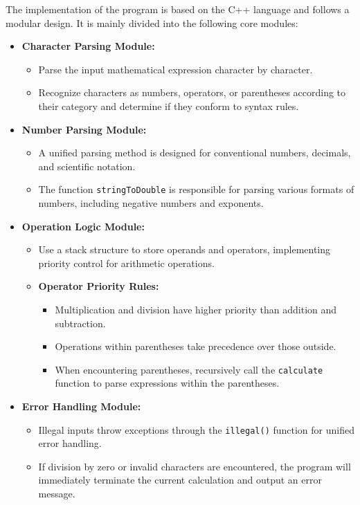 \documentclass{article}
\begin{document}
The implementation of the program is based on the C++ language and follows a modular design. It is mainly divided into the following core modules:

\begin{itemize}
    \item \textbf{Character Parsing Module:}
    \begin{itemize}
        \item Parse the input mathematical expression character by character.
        \item Recognize characters as numbers, operators, or parentheses according to their category and determine if they conform to syntax rules.
    \end{itemize}
    \item \textbf{Number Parsing Module:}
    \begin{itemize}
        \item A unified parsing method is designed for conventional numbers, decimals, and scientific notation.
        \item The function \texttt{stringToDouble} is responsible for parsing various formats of numbers, including negative numbers and exponents.
    \end{itemize}
    \item \textbf{Operation Logic Module:}
    \begin{itemize}
        \item Use a stack structure to store operands and operators, implementing priority control for arithmetic operations.
        \item \textbf{Operator Priority Rules:}
        \begin{itemize}
            \item Multiplication and division have higher priority than addition and subtraction.
            \item Operations within parentheses take precedence over those outside.
            \item When encountering parentheses, recursively call the \texttt{calculate} function to parse expressions within the parentheses.
        \end{itemize}
    \end{itemize}
    \item \textbf{Error Handling Module:}
    \begin{itemize}
        \item Illegal inputs throw exceptions through the \texttt{illegal()} function for unified error handling.
        \item If division by zero or invalid characters are encountered, the program will immediately terminate the current calculation and output an error message.
    \end{itemize}
\end{itemize}
\end{document}
